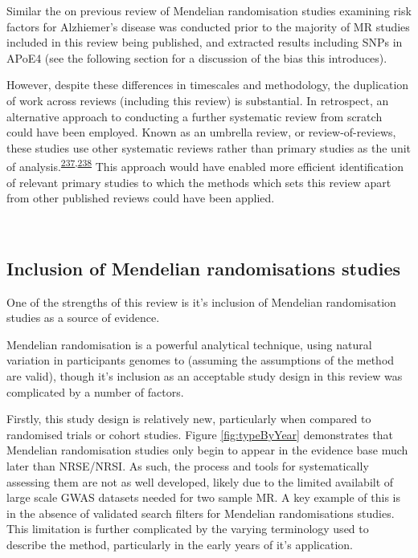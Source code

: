 \documentclass[a4paper, twoside]{templates/ociamthesis}
\begin{document}
Similar the on previous review of Mendelian randomisation studies examining risk factors for Alzhiemer's disease was conducted prior to the majority of MR studies included in this review being published, and extracted results including SNPs in APoE4 (see the following section for a discussion of the bias this introduces).

However, despite these differences in timescales and methodology, the duplication of work across reviews (including this review) is substantial. In retrospect, an alternative approach to conducting a further systematic review from scratch could have been employed. Known as an umbrella review, or review-of-reviews, these studies use other systematic reviews rather than primary studies as the unit of analysis.\textsuperscript{\protect\hyperlink{ref-aromataris2015}{237},\protect\hyperlink{ref-smith2011}{238}} This approach would have enabled more efficient identification of relevant primary studies to which the methods which sets this review apart from other published reviews could have been applied.

~

\hypertarget{rev-discussion-MR}{%
\subsection{Inclusion of Mendelian randomisations studies}\label{rev-discussion-MR}}

One of the strengths of this review is it's inclusion of Mendelian randomisation studies as a source of evidence.

Mendelian randomisation is a powerful analytical technique, using natural variation in participants genomes to (assuming the assumptions of the method are valid), though it's inclusion as an acceptable study design in this review was complicated by a number of factors.

Firstly, this study design is relatively new, particularly when compared to randomised trials or cohort studies. Figure \ref{fig:typeByYear} demonstrates that Mendelian randomisation studies only begin to appear in the evidence base much later than NRSE/NRSI. As such, the process and tools for systematically assessing them are not as well developed, likely due to the limited availabilt of large scale GWAS datasets needed for two sample MR. A key example of this is in the absence of validated search filters for Mendelian randomisations studies. This limitation is further complicated by the varying terminology used to describe the method, particularly in the early years of it's application.
\end{document}
